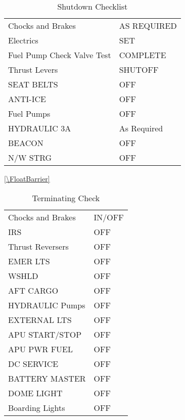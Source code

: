 \begin{table}[htbp]
\begin{minipage}{\linewidth}
\setlength{\tymax}{0.5\linewidth}
\centering
\small
\caption{Shutdown Checklist}
\label{shutdownchecklist}
\begin{tabulary}{\textwidth}{@{}ll@{}} \toprule
\midrule

 Chocks and Brakes   & AS REQUIRED \\
 Electrics     & SET   \\
 Fuel Pump Check Valve Test & COMPLETE \\
 Thrust Levers    & SHUTOFF  \\
 SEAT BELTS     & OFF   \\
 ANTI-ICE     & OFF   \\
 Fuel Pumps     & OFF   \\
 HYDRAULIC 3A    & As Required \\
 BEACON      & OFF   \\
 N\slash W STRG     & OFF   \\
\bottomrule

\end{tabulary}
\end{minipage}
\end{table}

\autoref{\FloatBarrier}

\begin{table}[htbp]
\begin{minipage}{\linewidth}
\setlength{\tymax}{0.5\linewidth}
\centering
\small
\caption{Terminating Check}
\label{terminatingcheck}
\begin{tabulary}{\textwidth}{@{}ll@{}} \toprule
\midrule

 Chocks and Brakes & IN\slash OFF \\
 IRS    & OFF \\
 Thrust Reversers & OFF \\
 EMER LTS   & OFF \\
 WSHLD    & OFF \\
 AFT CARGO   & OFF \\
 HYDRAULIC Pumps & OFF \\
 EXTERNAL LTS  & OFF \\
 APU START\slash STOP & OFF \\
 APU PWR FUEL  & OFF \\
 DC SERVICE  & OFF \\
 BATTERY MASTER & OFF \\
 DOME LIGHT  & OFF \\
 Boarding Lights & OFF \\
\bottomrule

\end{tabulary}
\end{minipage}
\end{table}

